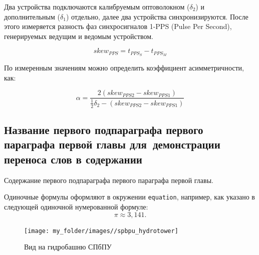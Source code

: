 Два устройства подключаются калибруемым оптоволокном ($\delta_{2}$) и дополнительным ($\delta_{1}$) отдельно, 
далее два устройства синхронизируются. После этого измеряется разность фаз синхросигналов 1-PPS
(Pulse Per Second), генерируемых ведущим и ведомым устройством. 

\begin{equation}
	skew_{PPS} = t_{PPS_S} - t_{PPS_M}
\end{equation}

По измеренным значениям можно определить коэффициент асимметричности, как:

\begin{equation}
	\alpha = \frac{2 \left( skew_{PPS2} - skew_{PPS1} \right) }{\frac{1}{2} \delta_2 - \left( skew_{PPS2} - skew_{PPS1} \right)}
\end{equation}






\subsection{Название первого подпараграфа первого параграфа первой главы для~демонстрации переноса слов в содержании} %

Содержание первого подпараграфа первого параграфа первой главы.



Одиночные формулы оформляют в окружении \texttt{equation}, например, как указано в следующей одиночной нумерованной формуле:
%
%
\begin{equation}%
\label{eq:Pi-ch1} %
\pi \approx 3,141.
\end{equation}
%
%
\begin{figure}[ht!] 
	\center
	\texttt{[image: my\_folder/images//spbpu\_hydrotower]}
	\caption{Вид на гидробашню СПбПУ \cite{spbpu-gallery}} 
	\label{fig:spbpu_hydrotower}  
\end{figure}
%
%


